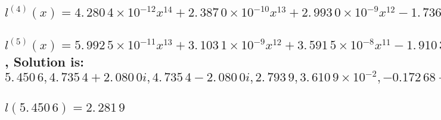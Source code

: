 \documentclass{article}
\begin{document}
\subsection{$l^{(4)}(x)=\allowbreak 4.\,\allowbreak 280\,4\times
10^{-12}x^{14}+2.\,\allowbreak 387\,0\times 10^{-10}\allowbreak
x^{13}+2.\,\allowbreak 993\,0\times 10^{-9}x^{12}-1.\,\allowbreak
736\,7\times 10^{-8}\allowbreak x^{11}-2.\,\allowbreak 539\,1\times
10^{-7}x^{10}+4.\,\allowbreak 770\,0\times 10^{-7}\allowbreak
x^{9}+8.\,\allowbreak 696\,5\times 10^{-6}x^{8}-2.\,\allowbreak 507\,9\times
10^{-6}x^{7}-\allowbreak 1.\,\allowbreak 296\,9\times
10^{-4}x^{6}-1.\,\allowbreak 441\,3\times 10^{-4}x^{5}-\allowbreak
8.\,\allowbreak 872\,6\times 10^{-4}x^{4}+1.\,\allowbreak 930\,0\times
10^{-3}x^{3}+0.024\,8\allowbreak x^{2}-1.\,\allowbreak 798\,4\times
10^{-3}x-5.\,\allowbreak 265\,8\times 10^{-2}$}

\subsection{$l^{(5)}(x)=\allowbreak 5.\,\allowbreak 992\,5\times
10^{-11}x^{13}+3.\,\allowbreak 103\,1\times 10^{-9}\allowbreak
x^{12}+3.\,\allowbreak 591\,5\times 10^{-8}x^{11}-1.\,\allowbreak
910\,3\times 10^{-7}\allowbreak x^{10}-2.\,\allowbreak 539\,1\times
10^{-6}x^{9}+4.\,\allowbreak 293\,0\times 10^{-6}\allowbreak
x^{8}+6.\,\allowbreak 957\,2\times 10^{-5}x^{7}-1.\,\allowbreak 755\,6\times
10^{-5}\allowbreak x^{6}-7.\,\allowbreak 781\,7\times
10^{-4}x^{5}-7.\,\allowbreak 206\,3\times 10^{-4}x^{4}-\allowbreak
3.\,\allowbreak 549\times 10^{-3}x^{3}+5.\,\allowbreak 790\,0\times
10^{-3}x^{2}+0.049\,6\allowbreak x-1.\,\allowbreak 798\,4\times 10^{-3}=0$,
Solution is: $5.\,\allowbreak 450\,6,4.\,\allowbreak 735\,4+\allowbreak
2.\,\allowbreak 080\,0i,4.\,\allowbreak 735\,4-\allowbreak 2.\,\allowbreak
080\,0i,2.\,\allowbreak 793\,9,\allowbreak 3.\,\allowbreak 610\,9\times
10^{-2},-0.172\,68+\allowbreak 2.\,\allowbreak
723\,8i,-0.172\,68-\allowbreak 2.\,\allowbreak 723\,8i,-2.\,\allowbreak
744\,5,-\allowbreak 4.\,\allowbreak 604\,3+2.\,\allowbreak 316\,5\allowbreak
i,-4.\,\allowbreak 604\,3-2.\,\allowbreak 316\,5\allowbreak
i,-5.\,\allowbreak 806\,0,-21.\,\allowbreak 943,-\allowbreak
29.\,\allowbreak 487$}

\subsection{$l(5.\,\allowbreak 450\,6)=\allowbreak 2.\,\allowbreak 281\,9$}
\end{document}
